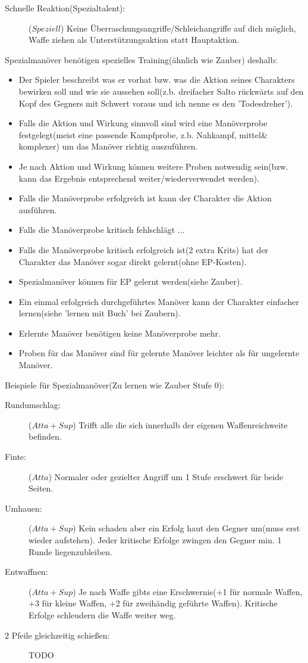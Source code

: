 \begin{description}
\item[Schnelle Reaktion(Spezialtalent):] ($Speziell$) Keine Überraschungsangriffe/Schleichangriffe auf dich möglich, Waffe ziehen als Unterstützungsaktion statt Hauptaktion.
\end{description}

Spezialmanöver benötigen spezielles Training(ähnlich wie Zauber) deshalb:
\begin{itemize}
\item Der Spieler beschreibt was er vorhat bzw. was die Aktion seines Charakters bewirken soll und wie sie aussehen soll(z.b. dreifacher Salto rückwärts auf den Kopf des Gegners mit Schwert voraus und ich nenne es den 'Todesdreher').
\item Falls die Aktion und Wirkung sinnvoll sind wird eine Manöverprobe festgelegt(meist eine passende Kampfprobe, z.b. Nahkampf, mittel\& komplexer) um das Manöver richtig auszuführen.
\item Je nach Aktion und Wirkung können weitere Proben notwendig sein(bzw. kann das Ergebnis entsprechend weiter/wiederverwendet werden).
\item Falls die Manöverprobe erfolgreich ist kann der Charakter die Aktion ausführen.
\item Falls die Manöverprobe kritisch fehlschlägt ...
\item Falls die Manöverprobe kritisch erfolgreich ist(2 extra Krits) hat der Charakter das Manöver sogar direkt gelernt(ohne EP-Kosten).
\item Spezialmanöver können für EP gelernt werden(siehe Zauber).
\item Ein einmal erfolgreich durchgeführtes Manöver kann der Charakter einfacher lernen(siehe 'lernen mit Buch' bei Zaubern).
\item Erlernte Manöver benötigen keine Manöverprobe mehr.
\item Proben für das Manöver sind für gelernte Manöver leichter als für ungelernte Manöver.
\end{itemize}
Beispiele für Spezialmanöver(Zu lernen wie Zauber Stufe 0):
\begin{description}
\item[Rundumschlag:] ($Atta + Sup$) Trifft alle die sich innerhalb der eigenen Waffenreichweite befinden.
\item[Finte:] ($Atta$) Normaler oder gezielter Angriff um 1 Stufe erschwert für beide Seiten.
\item[Umhauen:] ($Atta + Sup$) Kein schaden aber ein Erfolg haut den Gegner um(muss erst wieder aufstehen). Jeder kritische Erfolge zwingen den Gegner min. 1 Runde liegenzubleiben.
\item[Entwaffnen:] ($Atta + Sup$) Je nach Waffe gibts eine Erschwernis(+1 für normale Waffen, +3 für kleine Waffen, +2 für zweihändig geführte Waffen). Kritische Erfolge schleudern die Waffe weiter weg.

\item[2 Pfeile gleichzeitig schießen:] TODO
\end{description}

